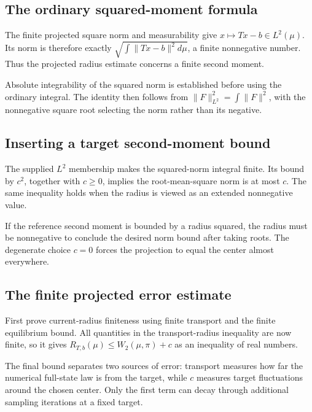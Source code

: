 \documentclass[11pt,a4paper]{article}
\begin{document}
\subsection{\texorpdfstring{The ordinary squared-moment formula}{The ordinary squared-moment formula}}


The finite projected square norm and measurability give \(x\mapsto Tx-b\in L^2(\mu)\). Its norm is therefore exactly \(\sqrt{\int\|Tx-b\|^2d\mu}\), a finite nonnegative number. Thus the projected radius estimate concerns a finite second moment.



Absolute integrability of the squared norm is established before using the ordinary integral. The identity then follows from \(\|F\|_{L^2}^2=\int\|F\|^2\), with the nonnegative square root selecting the norm rather than its negative.


\subsection{\texorpdfstring{Inserting a target second-moment bound}{Inserting a target second-moment bound}}


The supplied \(L^2\) membership makes the squared-norm integral finite. Its bound by \(c^2\), together with \(c\ge0\), implies the root-mean-square norm is at most \(c\). The same inequality holds when the radius is viewed as an extended nonnegative value.



If the reference second moment is bounded by a radius squared, the radius must be nonnegative to conclude the desired norm bound after taking roots. The degenerate choice \(c=0\) forces the projection to equal the center almost everywhere.


\subsection{\texorpdfstring{The finite projected error estimate}{The finite projected error estimate}}


First prove current-radius finiteness using finite transport and the finite equilibrium bound. All quantities in the transport-radius inequality are now finite, so it gives \(R_{T,b}(\mu)\le W_2(\mu,\pi)+c\) as an inequality of real numbers.



The final bound separates two sources of error: transport measures how far the numerical full-state law is from the target, while \(c\) measures target fluctuations around the chosen center. Only the first term can decay through additional sampling iterations at a fixed target.
\end{document}
